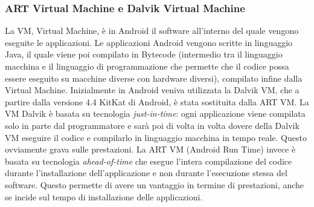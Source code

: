 \subsubsection{ART Virtual Machine e Dalvik Virtual Machine}
La VM, Virtual Machine, è in Android il software all’interno del
quale vengono eseguite le applicazioni. Le applicazioni Android vengono scritte in
linguaggio Java, il quale viene poi compilato in Bytecode
(intermedio tra il linguaggio macchina e il linguaggio di
programmazione che permette che il codice possa essere eseguito su macchine
diverse con hardware diversi), compilato infine
dalla Virtual Machine. Inizialmente in Android veniva utilizzata la Dalvik VM,
che a partire dalla versione 4.4 KitKat di Android, è stata sostituita dalla ART
VM.
La VM Dalvik è basata su tecnologia \textit{just-in-time}: ogni applicazione viene
compilata solo in parte dal programmatore e sarà poi di volta in volta dovere
della Dalvik VM eseguire il codice e compilarlo in linguaggio macchina in tempo
reale. Questo ovviamente grava sulle prestazioni.
La ART VM (Android Run Time) invece è basata su tecnologia \textit{ahead-of-time} che esegue l'intera
compilazione del codice durante l'installazione dell'applicazione e non durante
l'esecuzione stessa del software. Questo permette di avere un vantaggio in
termine di prestazioni, anche se incide sul tempo di installazione delle
applicazioni.

